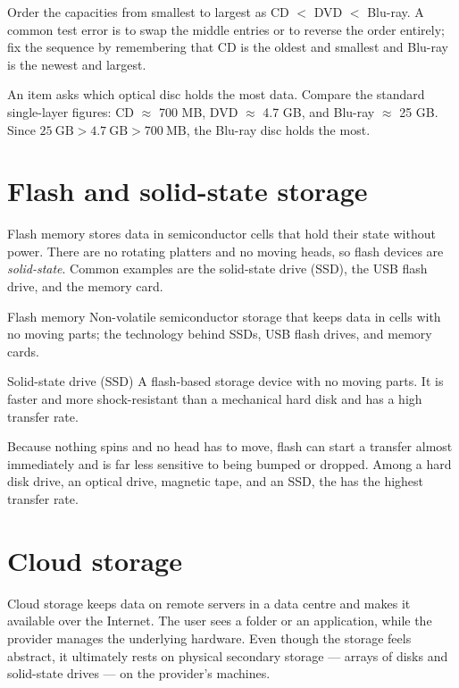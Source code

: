 Order the capacities from smallest to largest as CD $<$ DVD $<$ Blu-ray.
A common test error is to swap the middle entries or to reverse the order
entirely; fix the sequence by remembering that CD is the oldest and smallest
and Blu-ray is the newest and largest.

\begin{example}
An item asks which optical disc holds the most data. Compare the standard
single-layer figures: CD $\approx$ 700 MB, DVD $\approx$ 4.7 GB, and Blu-ray
$\approx$ 25 GB. Since $25\ \text{GB} > 4.7\ \text{GB} > 700\ \text{MB}$, the
Blu-ray disc holds the most.
\end{example}

\section{Flash and solid-state storage}
Flash memory stores data in semiconductor cells that hold their state without
power. There are no rotating platters and no moving heads, so flash devices
are \emph{solid-state}. Common examples are the solid-state drive (SSD), the
USB flash drive, and the memory card.

\begin{definitionbox}{Flash memory}
Non-volatile semiconductor storage that keeps data in cells with no moving
parts; the technology behind SSDs, USB flash drives, and memory cards.
\end{definitionbox}

\begin{definitionbox}{Solid-state drive (SSD)}
A flash-based storage device with no moving parts. It is faster and more
shock-resistant than a mechanical hard disk and has a high transfer rate.
\end{definitionbox}

Because nothing spins and no head has to move, flash can start a transfer
almost immediately and is far less sensitive to being bumped or dropped.
Among a hard disk drive, an optical drive, magnetic tape, and an SSD, the
 has the highest transfer rate.

\section{Cloud storage}
Cloud storage keeps data on remote servers in a data centre and makes it
available over the Internet. The user sees a folder or an application, while
the provider manages the underlying hardware. Even though the storage feels
abstract, it ultimately rests on physical secondary storage --- arrays of
disks and solid-state drives --- on the provider's machines.

